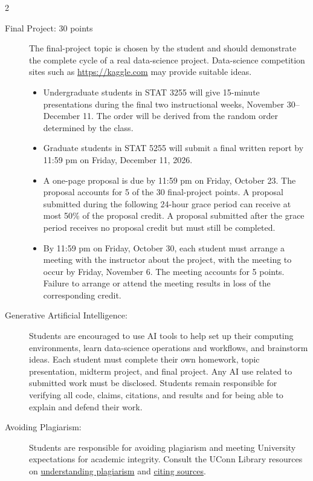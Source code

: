 \documentclass{article}
\begin{document}
\begin{multicols}{2}
\begin{description}
\item[Final Project: 30 points]
  The final-project topic is chosen by the student and should demonstrate the
  complete cycle of a real data-science project. Data-science competition
  sites such as \url{https://kaggle.com} may provide suitable ideas.

\begin{itemize}
\item Undergraduate students in STAT 3255 will give 15-minute presentations during
  the final two instructional weeks, November 30--December 11. The order will
  be derived from the random order determined by the class.

\item Graduate students in STAT 5255 will submit a final written report by
  11:59 pm on Friday, December 11, 2026.

\item A one-page proposal is due by 11:59 pm on Friday, October 23. The proposal
  accounts for 5 of the 30 final-project points. A proposal submitted during
  the following 24-hour grace period can receive at most 50\% of the proposal
  credit. A proposal submitted after the grace period receives no proposal
  credit but must still be completed.

\item By 11:59 pm on Friday, October 30, each student must arrange a meeting with
  the instructor about the project, with the meeting to occur by Friday,
  November 6. The meeting accounts for 5 points. Failure to arrange or attend
  the meeting results in loss of the corresponding credit.
\end{itemize}

\item[Generative Artificial Intelligence:]
  Students are encouraged to use AI tools to help set up their computing
  environments, learn data-science operations and workflows, and brainstorm
  ideas. Each student must complete their own homework, topic presentation,
  midterm project, and final project. Any AI use related to submitted work
  must be disclosed. Students remain responsible for verifying
  all code, claims, citations, and results and for being able to explain and
  defend their work.

\item[Avoiding Plagiarism:]
  Students are responsible for avoiding plagiarism and meeting University
  expectations for academic integrity. Consult the UConn Library resources on
  \href{https://lib.uconn.edu/services/ask/get-help/writing/plagiarism-resources/}{understanding plagiarism} and
  \href{https://guides.lib.uconn.edu/quickstart}{citing sources}.


\end{description}
\end{multicols}
\end{document}
